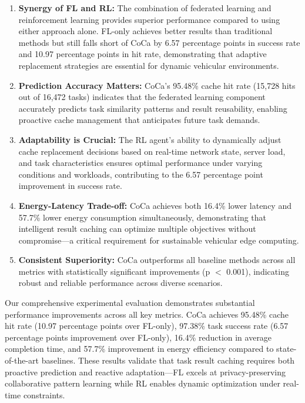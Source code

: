 \begin{enumerate}
    \item \textbf{Synergy of FL and RL:} The combination of federated learning and reinforcement learning provides superior performance compared to using either approach alone. FL-only achieves better results than traditional methods but still falls short of CoCa by 6.57 percentage points in success rate and 10.97 percentage points in hit rate, demonstrating that adaptive replacement strategies are essential for dynamic vehicular environments.
    
    \item \textbf{Prediction Accuracy Matters:} CoCa's 95.48\% cache hit rate (15,728 hits out of 16,472 tasks) indicates that the federated learning component accurately predicts task similarity patterns and result reusability, enabling proactive cache management that anticipates future task demands.
    
    \item \textbf{Adaptability is Crucial:} The RL agent's ability to dynamically adjust cache replacement decisions based on real-time network state, server load, and task characteristics ensures optimal performance under varying conditions and workloads, contributing to the 6.57 percentage point improvement in success rate.
    
    \item \textbf{Energy-Latency Trade-off:} CoCa achieves both 16.4\% lower latency and 57.7\% lower energy consumption simultaneously, demonstrating that intelligent result caching can optimize multiple objectives without compromise—a critical requirement for sustainable vehicular edge computing.
    
    \item \textbf{Consistent Superiority:} CoCa outperforms all baseline methods across all metrics with statistically significant improvements (p $<$ 0.001), indicating robust and reliable performance across diverse scenarios.
\end{enumerate}

Our comprehensive experimental evaluation demonstrates substantial performance improvements across all key metrics. CoCa achieves 95.48\% cache hit rate (10.97 percentage points over FL-only), 97.38\% task success rate (6.57 percentage points improvement over FL-only), 16.4\% reduction in average completion time, and 57.7\% improvement in energy efficiency compared to state-of-the-art baselines. These results validate that task result caching requires both proactive prediction and reactive adaptation—FL excels at privacy-preserving collaborative pattern learning while RL enables dynamic optimization under real-time constraints.
